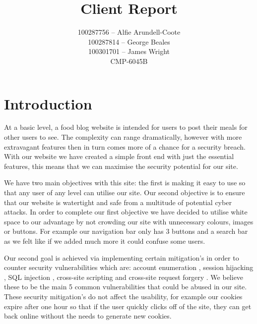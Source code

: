 \documentclass{ueacmpstyle}
\begin{document}
	\title{Client Report}    %
	\author{
		100287756 -- Alfie Arundell-Coote\\
		100287814 -- George Beales\\
		100301701 -- James Wright\\
		CMP-6045B     %
	}
	\maketitle
	
	\section{Introduction}\label{sec:Intro}
	At a basic level, a food blog website is intended for users to post their meals for other users to see. The complexity can range dramatically, however with more extravagant features then in turn comes more of a chance for a security breach. With our website we have created a simple front end with just the essential features, this means that we can maximise the security potential for our site.
	
	We have two main objectives with this site: the first is making it easy to use so that any user of any level can utilise our site. Our second objective is to ensure that our website is watertight and safe from a multitude of potential cyber attacks.
	In order to complete our first objective we have decided to utilise white space to our advantage by not crowding our site with unnecessary colours, images or buttons. For example our navigation bar only has 3 buttons and a search bar as we felt like if we added much more it could confuse some users.
	
	Our second goal is achieved via implementing certain mitigation's in order to counter security vulnerabilities which are: account enumeration \cite{accenum}, session hijacking \cite{sessionhijack}, SQL injection \cite{sqlinjection}, cross-site scripting \cite{xss} and cross-site request forgery \cite{csrf}. We believe these to be the main 5 common vulnerabilities that could be abused in our site. These security mitigation's do not affect the usability, for example our cookies expire after one hour so that if the user quickly clicks off of the site, they can get back online without the needs to generate new cookies.
	
\end{document}
